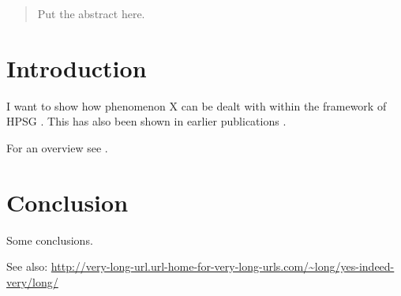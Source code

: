 \documentclass[11pt,a4paper,fleqn,draft]{article}
\let\citew\citet
\begin{document}

\begin{abstract}
Put the abstract here.
\end{abstract}

\setcounter{footnote}{2}
\renewcommand{\thefootnote}{\fnsymbol{footnote}}
\renewcommand{\thefootnote}{\arabic{footnote}}
\setcounter{footnote}{0}


\section{Introduction}

I want to show how phenomenon X can be dealt with within the framework of HPSG
\citep{PS87a,PS94a}. This has also been shown in earlier publications
\parencites[145]{PS87a}[256]{PS94a}.

For an overview see \citew{BC2021a}.

\section{Conclusion}

Some conclusions.


See also: \url{http://very-long-url.url-home-for-very-long-urls.com/~long/yes-indeed-very/long/}



{\sloppy
\printbibliography[heading=subbibliography,notkeyword=this] 
}
\end{document}
